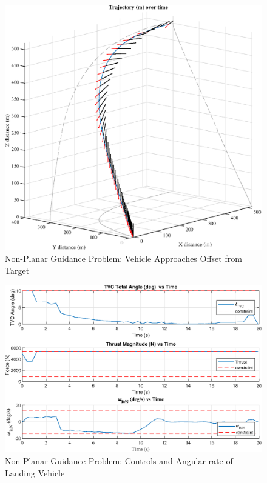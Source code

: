 \clearpage
\begin{figure}[!htbp] 
  \centering
  \includegraphics[width=\textwidth]{figs/nonplanar_3dtraj.eps}
  \caption{Non-Planar Guidance Problem: Vehicle Approaches Offset from Target}
  \label{fig:nplanar}
 \end{figure}
\begin{figure}[!htbp] 
  \centering
  \includegraphics[width=\textwidth]{figs/nonplanar_controls.eps}
  \caption{Non-Planar Guidance Problem: Controls and Angular rate of Landing Vehicle}
  \label{fig:nplanarcontrols}
 \end{figure}


